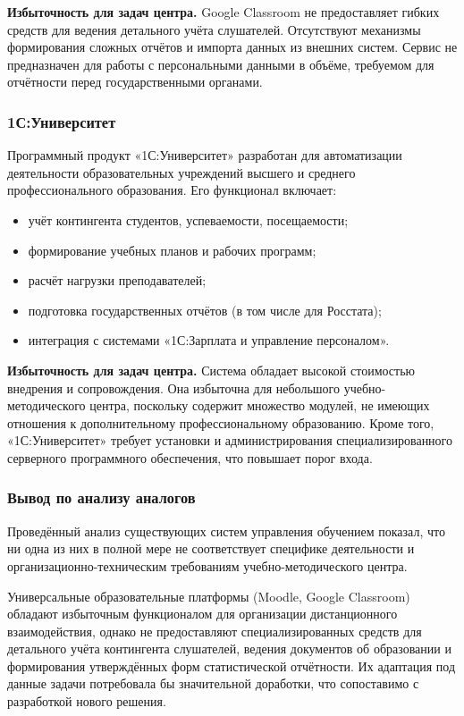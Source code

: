 \textbf{Избыточность для задач центра.} Google Classroom не предоставляет гибких средств для ведения детального учёта слушателей. Отсутствуют механизмы формирования сложных отчётов и импорта данных из внешних систем. Сервис не предназначен для работы с персональными данными в объёме, требуемом для отчётности перед государственными органами.

\subsubsection{1С:Университет}
Программный продукт «1С:Университет» разработан для автоматизации деятельности образовательных учреждений высшего и среднего профессионального образования. Его функционал включает:
\begin{itemize}
	\item учёт контингента студентов, успеваемости, посещаемости;
	\item формирование учебных планов и рабочих программ;
	\item расчёт нагрузки преподавателей;
	\item подготовка государственных отчётов (в том числе для Росстата);
	\item интеграция с системами «1С:Зарплата и управление персоналом».
\end{itemize}

\textbf{Избыточность для задач центра.} Система обладает высокой стоимостью внедрения и сопровождения. Она избыточна для небольшого учебно-методического центра, поскольку содержит множество модулей, не имеющих отношения к дополнительному профессиональному образованию. Кроме того, «1С:Университет» требует установки и администрирования специализированного серверного программного обеспечения, что повышает порог входа.

\subsubsection{Вывод по анализу аналогов}

Проведённый анализ существующих систем управления обучением показал, что ни одна из них в полной мере не соответствует специфике деятельности и организационно-техническим требованиям учебно-методического центра.

Универсальные образовательные платформы (Moodle, Google Classroom) обладают избыточным функционалом для организации дистанционного взаимодействия, однако не предоставляют специализированных средств для детального учёта контингента слушателей, ведения документов об образовании и формирования утверждённых форм статистической отчётности. Их адаптация под данные задачи потребовала бы значительной доработки, что сопоставимо с разработкой нового решения.

